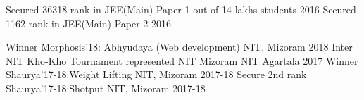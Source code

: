 \begin{cvhonors}
  \cvhonor
    {Secured 36318 rank in JEE(Main) Paper-1}
    {out of 14 lakhs students}
    {}
    {2016}
  \cvhonor
    {Secured 1162 rank in JEE(Main) Paper-2}
    {}
    {}
    {2016}
\end{cvhonors}

\begin{cvhonors}
    \cvhonor
    {Winner}
    {Morphosis'18: Abhyudaya (Web development)}
    {NIT, Mizoram}
    {2018 }
  \cvhonor
    {Inter NIT Kho-Kho Tournament}
    {represented NIT Mizoram}
    {NIT Agartala}
    {2017}
  \cvhonor
    {Winner}
    {Shaurya'17-18:Weight Lifting}
    {NIT, Mizoram}
    {2017-18 }
  \cvhonor
    {Secure 2nd rank}
    {Shaurya'17-18:Shotput}
    {NIT, Mizoram}
    {2017-18}
\end{cvhonors}